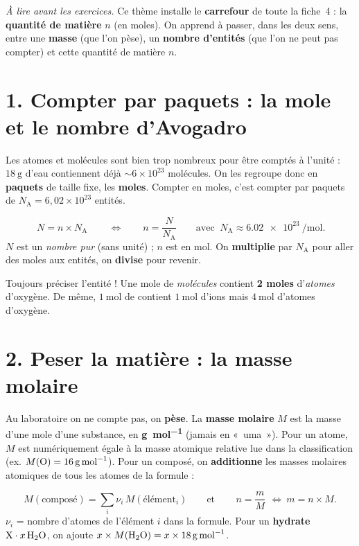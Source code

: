 \documentclass[11pt,a4paper]{article}
\newcommand{\NA}{N_{\!\text{A}}}
\begin{document}
\begin{tcolorbox}[boxbase,colback=primary!12,colframe=primary,
   title={\Large THÈME 1 --- Mole, masse molaire et nombre d'entités}]
\textit{À lire avant les exercices.} Ce thème installe le \textbf{carrefour} de toute la
fiche~4 : la \textbf{quantité de matière} $n$ (en moles). On apprend à passer, dans les deux sens,
entre une \textbf{masse} (que l'on pèse), un \textbf{nombre d'entités} (que l'on ne peut pas compter)
et cette quantité de matière $n$.
\end{tcolorbox}

\section*{1. Compter par paquets : la mole et le nombre d'Avogadro}
Les atomes et molécules sont bien trop nombreux pour être comptés à l'unité : $\SI{18}{\gram}$
d'eau contiennent déjà $\sim 6\times10^{23}$ molécules. On les regroupe donc en \textbf{paquets} de
taille fixe, les \textbf{moles}. Compter en moles, c'est compter par paquets de
$\NA = 6{,}02\times10^{23}$ entités.

\begin{formule}
\[ \boxed{\,N = n\times\NA\,}\qquad\Longleftrightarrow\qquad n=\dfrac{N}{\NA}
   \qquad\text{avec }\ \NA \approx \SI{6.02e23}{\per\mole}. \]
$N$ est un \emph{nombre pur} (sans unité) ; $n$ est en \si{\mole}. On \textbf{multiplie} par $\NA$
pour aller des moles aux entités, on \textbf{divise} pour revenir.
\end{formule}

\begin{attention}
Toujours préciser l'entité ! Une mole de \emph{molécules}  contient \textbf{2 moles}
d'\emph{atomes} d'oxygène. De même, $\SI{1}{\mole}$ de  contient $\SI{1}{\mole}$ d'ions
 mais $\SI{4}{\mole}$ d'atomes d'oxygène.
\end{attention}

\section*{2. Peser la matière : la masse molaire}
Au laboratoire on ne compte pas, on \textbf{pèse}. La \textbf{masse molaire} $M$ est la masse d'une
mole d'une substance, en \textbf{\si{\gram\per\mole}} (jamais en «~uma~»). Pour un atome, $M$ est
numériquement égale à la masse atomique relative lue dans la classification (ex.
$M(\ce{O})=\SI{16}{\gram\per\mole}$). Pour un composé, on \textbf{additionne} les masses molaires
atomiques de tous les atomes de la formule :
\begin{formule}
\[ M(\text{composé})=\sum_i \nu_i\,M(\text{élément}_i)
   \qquad\text{et}\qquad \boxed{\,n=\dfrac{m}{M}\,}\ \Longleftrightarrow\ m=n\times M. \]
$\nu_i$ = nombre d'atomes de l'élément $i$ dans la formule. Pour un \textbf{hydrate}
$\ce{X}\cdot x\,\ce{H2O}$, on ajoute $x\times M(\ce{H2O})=x\times\SI{18}{\gram\per\mole}$.
\end{formule}
\end{document}
